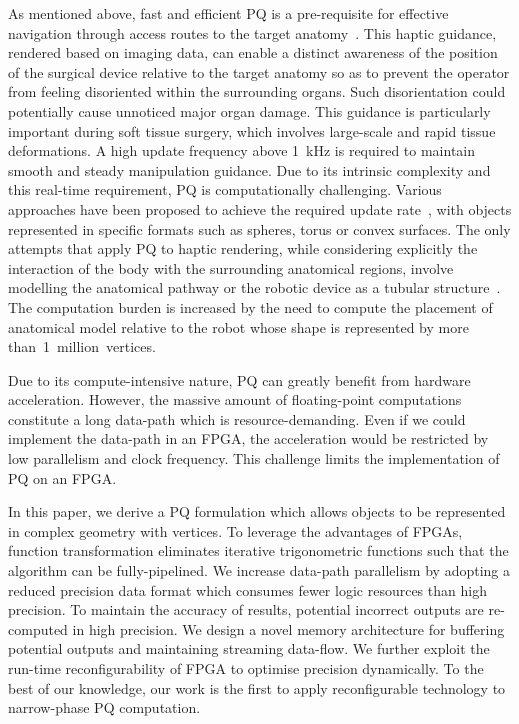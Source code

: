 As mentioned above, fast and efficient PQ is a pre-requisite for effective navigation through access routes to the target anatomy~\cite{kwok10}.
This haptic guidance, rendered based on imaging data, can enable a distinct awareness of the position of the surgical device relative to the target anatomy so as to prevent the operator from feeling disoriented within the surrounding organs. 
Such disorientation could potentially cause unnoticed major organ damage. 
This guidance is particularly important during soft tissue surgery, which involves large-scale and rapid tissue deformations. 
A high update frequency above 1~kHz is required to maintain smooth and steady manipulation guidance. 
Due to its intrinsic complexity and this real-time requirement, PQ is computationally challenging.
Various approaches have been proposed to achieve the required update rate~\cite{benallegue09,chakraborty08}, 
with objects represented in specific formats such as spheres, torus or convex surfaces.
The only attempts that apply PQ to haptic rendering, while considering explicitly the interaction of the body with the surrounding anatomical regions, involve modelling the anatomical pathway or the robotic device as a tubular structure~\cite{li07,kwok13}.
The computation burden is increased by the need to compute the placement of anatomical model relative to the robot whose shape is represented by more than~1~million~vertices.

Due to its compute-intensive nature, PQ can greatly benefit from hardware acceleration.
However, the massive amount of floating-point computations constitute a long data-path which is resource-demanding.
Even if we could implement the data-path in an FPGA, the acceleration would be restricted by low parallelism and clock frequency.
This challenge limits the implementation of PQ on an FPGA.

In this paper, we derive a PQ formulation which allows objects to be represented in complex geometry with vertices.
To leverage the advantages of FPGAs, function transformation eliminates iterative trigonometric functions such that the algorithm can be fully-pipelined.
We increase data-path parallelism by adopting a reduced precision data format which consumes fewer logic resources than high precision.
To maintain the accuracy of results, potential incorrect outputs are re-computed in high precision.
We design a novel memory architecture for buffering potential outputs and maintaining streaming data-flow.
We further exploit the run-time reconfigurability of FPGA to optimise precision dynamically.
To the best of our knowledge, our work is the first to apply reconfigurable technology to narrow-phase PQ computation.

